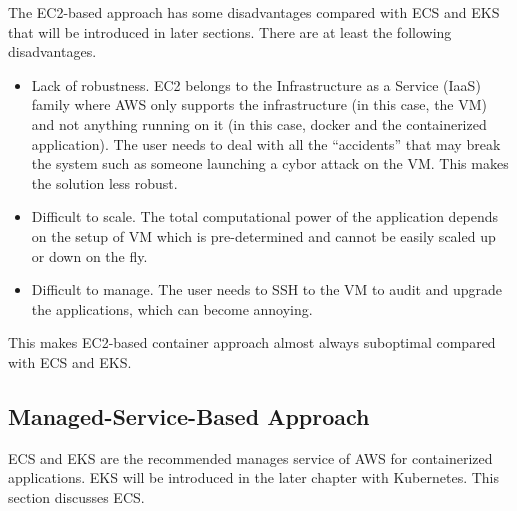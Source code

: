 The EC2-based approach has some disadvantages compared with ECS and EKS that will be introduced in later sections. There are at least the following disadvantages.
\begin{itemize}
  \item Lack of robustness. EC2 belongs to the Infrastructure as a Service (IaaS) family where AWS only supports the infrastructure (in this case, the VM) and not anything running on it (in this case, docker and the containerized application). The user needs to deal with all the ``accidents'' that may break the system such as someone launching a cybor attack on the VM. This makes the solution less robust.
  \item Difficult to scale. The total computational power of the application depends on the setup of VM which is pre-determined and cannot be easily scaled up or down on the fly.
  \item Difficult to manage. The user needs to SSH to the VM to audit and upgrade the applications, which can become annoying.
\end{itemize}
This makes EC2-based container approach almost always suboptimal compared with ECS and EKS.

\subsection{Managed-Service-Based Approach}

ECS and EKS are the recommended manages service of AWS for containerized applications. EKS will be introduced in the later chapter with Kubernetes. This section discusses ECS. 













